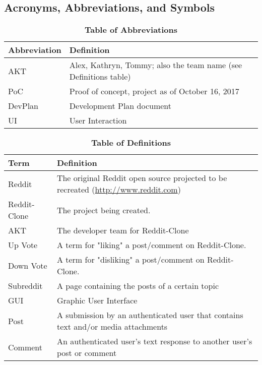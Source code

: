 \documentclass[12pt,fleqn]{article}
\begin{document}
\subsection {Acronyms, Abbreviations, and Symbols}

\begin{table}[ht]
\caption{\textbf{Table of Abbreviations}} \label{Abbreviations}

\begin{tabularx}{\textwidth}{p{3cm}X}
\toprule
\textbf{Abbreviation} & \textbf{Definition} \\
\midrule
AKT & Alex, Kathryn, Tommy; also the team name (see Definitions table)\\
PoC & Proof of concept, project as of October 16, 2017\\
DevPlan & Development Plan document \\
UI & User Interaction \\

\bottomrule
\end{tabularx}

\end{table}

\begin{table}[ht]
\caption{\textbf{Table of Definitions}} \label{Definitions}

\begin{tabularx}{\textwidth}{p{3cm}X}
\toprule
\textbf{Term} & \textbf{Definition}\\
\midrule
Reddit & The original Reddit open source projected to be recreated (\url{http://www.reddit.com})\\
Reddit-Clone & The project being created.\\
AKT & The developer team for Reddit-Clone\\
Up Vote & A term for "liking" a post/comment on Reddit-Clone.  \\
Down Vote & A term for "disliking" a post/comment on Reddit-Clone. \\
Subreddit & A page containing the posts of a certain topic \\
GUI & Graphic User Interface \\ 
Post & A submission by an authenticated user that contains text and/or media attachments \\
Comment & An authenticated user's text response to another user's post or comment \\
\bottomrule
\end{tabularx}

\end{table}	
\end{document}
